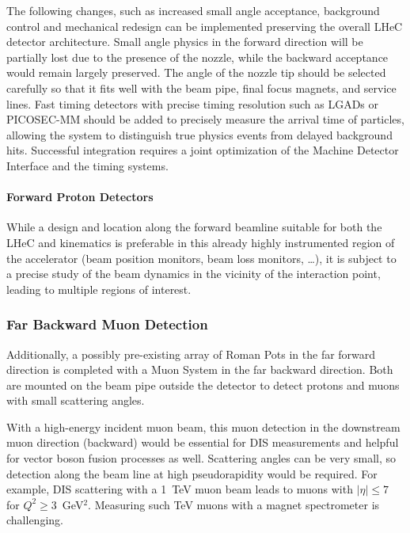 The following changes, such as increased small angle acceptance, background control and mechanical redesign can be implemented preserving the overall LHeC detector architecture.
Small angle physics in the forward direction will be partially lost due to the presence of the nozzle, while the backward acceptance would remain largely preserved. The angle of the nozzle tip should be selected carefully so that it fits well with the beam pipe, final focus magnets, and service lines. Fast timing detectors with precise timing resolution such as LGADs or  PICOSEC-MM should be added to precisely measure the arrival time of particles, allowing the system to distinguish true physics events from delayed background hits. Successful integration requires a joint optimization of the Machine Detector Interface and the timing systems.

\paragraph {\bf Forward Proton Detectors}

While a design and location along the forward beamline suitable for both the LHeC and \lhuc kinematics is preferable in this already highly instrumented region of the accelerator (beam position monitors, beam loss monitors, \ldots), it is subject to a precise study of the beam dynamics in the vicinity of the interaction point, leading to multiple  regions of interest.



\subsubsection{Far Backward Muon Detection}

Additionally, a possibly pre-existing array of Roman Pots in the far forward direction is completed with a Muon System in the far backward direction.
Both are mounted on the beam pipe outside the detector to detect protons and muons with small scattering angles.

With a high-energy incident muon beam, this muon detection in the downstream muon direction (backward) would be essential for DIS measurements and helpful for vector boson fusion processes as well.
Scattering angles can be very small, so detection along the beam line at high pseudorapidity would be required.
For example, DIS scattering with a 1~TeV muon beam leads to muons with $|\eta| \le 7$ for $Q^2\ge  3$~GeV$^2$.
Measuring such TeV muons with a magnet spectrometer is challenging.

